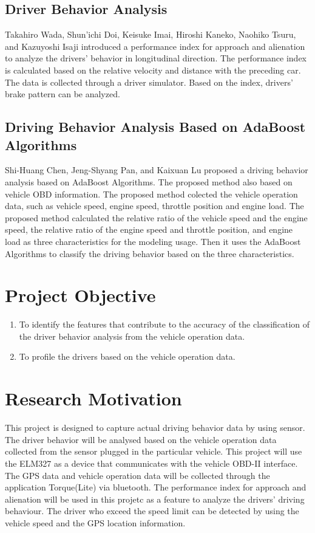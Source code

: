\subsection{Driver Behavior Analysis}
Takahiro Wada, Shun'ichi Doi, Keisuke Imai, Hiroshi Kaneko, Naohiko Tsuru, and Kazuyoshi Isaji introduced a performance index for approach and alienation to analyze the drivers' behavior in longitudinal direction. The performance index is calculated based on the relative velocity and distance with the preceding car. The data is collected through a driver simulator. Based on the index, drivers' brake pattern can be analyzed.

\subsection{Driving Behavior Analysis Based on AdaBoost Algorithms}
Shi-Huang Chen, Jeng-Shyang Pan, and Kaixuan Lu proposed a driving behavior analysis based on AdaBoost Algorithms. The proposed method also based on vehicle OBD information. The proposed method colected the vehicle operation data, such as vehicle speed, engine speed, throttle position and engine load. The proposed method calculated the relative ratio of the vehicle speed and the engine speed, the relative ratio of the engine speed and throttle position, and engine load as three characteristics for the modeling usage. Then it uses the AdaBoost Algorithms to classify the driving behavior based on the three characteristics.

\section{Project Objective}
\begin{enumerate}
\item To identify the features that contribute to the accuracy of the classification of the driver behavior analysis from the vehicle operation data.
\item To profile the drivers based on the vehicle operation data. 
\end{enumerate}

\section{Research Motivation}
This project is designed to capture actual driving behavior data by using sensor. The driver behavior will be analysed based on the vehicle operation data collected from the sensor plugged in the particular vehicle.  
This project will use the ELM327 as a device that communicates with the vehicle OBD-II interface. The GPS data and vehicle operation data will be collected through the application Torque(Lite) via bluetooth. 
The performance index for approach and alienation will be used in this projetc as a feature to analyze the drivers' driving behaviour. The driver who exceed the speed limit can be detected by using the vehicle speed and the GPS location information.

